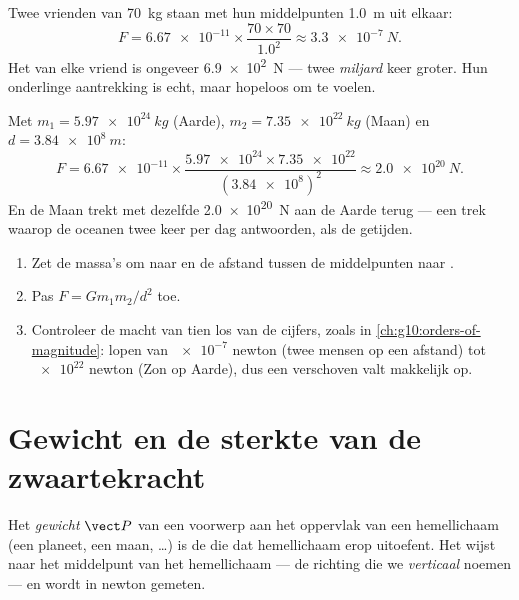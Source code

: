 \begin{example}\label{ex:g10:universal-gravitation:friends}
Twee vrienden van \qty{70}{kg} staan met hun middelpunten \qty{1.0}{m}
uit elkaar:
\[
F = \num{6.67e-11} \times \frac{70 \times 70}{1.0^2}
\approx \qty{3.3e-7}{N}.
\]
Het  van elke vriend is ongeveer \qty{6.9e2}{N} --- twee
\emph{miljard} keer groter. Hun onderlinge aantrekking is echt, maar
hopeloos om te voelen.
\end{example}

\begin{example}\label{ex:g10:universal-gravitation:earthmoon}
Met $m_1 = \qty{5.97e24}{kg}$ (Aarde), $m_2 = \qty{7.35e22}{kg}$ (Maan)
en $d = \qty{3.84e8}{m}$:
\[
F = \num{6.67e-11} \times
\frac{\num{5.97e24} \times \num{7.35e22}}{(\num{3.84e8})^2}
\approx \qty{2.0e20}{N}.
\]
En de Maan trekt met dezelfde \qty{2.0e20}{N} aan de Aarde terug --- een
trek waarop de oceanen twee keer per dag antwoorden, als de getijden.
\end{example}

\begin{method}\label{met:g10:universal-gravitation:compute}
\begin{enumerate}
  \item Zet de massa's om naar  en de afstand tussen de
        middelpunten naar .
  \item Pas $F = G m_1 m_2 / d^2$ toe.
  \item Controleer de macht van tien los van de cijfers, zoals in
        \cref{ch:g10:orders-of-magnitude}:  lopen van
        $\num{e-7}$ newton (twee mensen op een  afstand) tot
        $\num{e22}$ newton (Zon op Aarde), dus een verschoven 
        valt makkelijk op.
\end{enumerate}
\end{method}

\section{Gewicht en de sterkte van de zwaartekracht}

\begin{definition}[Gewicht]\label{def:g10:universal-gravitation:weight}
Het \emph{gewicht} $\vect P$ van een voorwerp aan het
oppervlak van een hemellichaam (een planeet, een maan, \dots) is de
 die dat hemellichaam erop uitoefent. Het wijst naar het
middelpunt van het hemellichaam --- de richting die we
\emph{verticaal} noemen --- en wordt in newton gemeten.
\end{definition}

